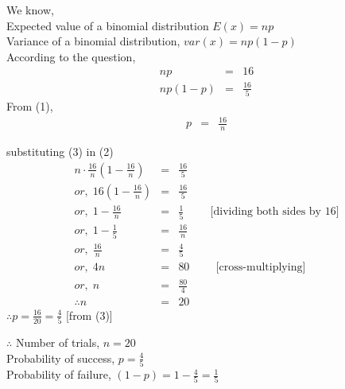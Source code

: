 \documentclass{article}
\begin{document}
\Large{
    We know,\\
    Expected value of a binomial distribution $E(x)=np$\\
    Variance of a binomial distribution, $var(x) = np(1-p)$\\
    According to the question,
    \begin{eqnarray}
        np &=& 16\\
        np(1-p) &=& \frac{16}{5}
    \end{eqnarray}
    From (1),
    \begin{eqnarray}
        p &=& \frac{16}{n}
    \end{eqnarray}

    substituting (3) in (2)
    \begin{eqnarray*}
        n\cdot\frac{16}{n} \left(1-\frac{16}{n}\right) &=& \frac{16}{5}\\
        or,\; 16\left(1-\frac{16}{n}\right) &=& \frac{16}{5}\\
        or,\; 1-\frac{16}{n} &=& \frac{1}{5}\hspace{1cm}\text{[dividing both sides by 16]}\\
        or,\; 1-\frac{1}{5} &=& \frac{16}{n}\\
        or,\; \frac{16}{n} &=& \frac{4}{5}\\
        or,\; 4n &=& 80 \hspace{1cm}\text{[cross-multiplying]}\\
        or,\; n &=& \frac{80}{4}\\
        \therefore n &=& 20
    \end{eqnarray*}
    $\therefore p = \frac{16}{20} = \frac{4}{5}$ \hspace{1cm}[from (3)]

    $\therefore$ Number of trials, $n = 20$\\
    Probability of success, $p = \frac{4}{5}$\\
    Probability of failure, $(1-p) = 1-\frac{4}{5}=\frac{1}{5}$
    
}
\end{document}
